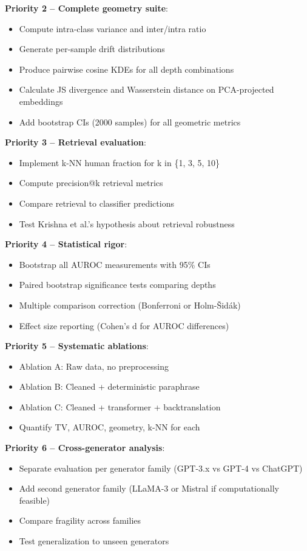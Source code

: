 \documentclass[conference]{IEEEtran}
\begin{document}
\textbf{Priority 2 – Complete geometry suite}:
\begin{itemize}
    \item Compute intra-class variance and inter/intra ratio
    \item Generate per-sample drift distributions
    \item Produce pairwise cosine KDEs for all depth combinations
    \item Calculate JS divergence and Wasserstein distance on PCA-projected embeddings
    \item Add bootstrap CIs (2000 samples) for all geometric metrics
\end{itemize}

\textbf{Priority 3 – Retrieval evaluation}:
\begin{itemize}
    \item Implement k-NN human fraction for k in \{1, 3, 5, 10\}
    \item Compute precision@k retrieval metrics
    \item Compare retrieval to classifier predictions
    \item Test Krishna et al.'s hypothesis about retrieval robustness
\end{itemize}

\textbf{Priority 4 – Statistical rigor}:
\begin{itemize}
    \item Bootstrap all AUROC measurements with 95\% CIs
    \item Paired bootstrap significance tests comparing depths
    \item Multiple comparison correction (Bonferroni or Holm-Šidák)
    \item Effect size reporting (Cohen's d for AUROC differences)
\end{itemize}

\textbf{Priority 5 – Systematic ablations}:
\begin{itemize}
    \item Ablation A: Raw data, no preprocessing
    \item Ablation B: Cleaned + deterministic paraphrase
    \item Ablation C: Cleaned + transformer + backtranslation
    \item Quantify TV, AUROC, geometry, k-NN for each
\end{itemize}

\textbf{Priority 6 – Cross-generator analysis}:
\begin{itemize}
    \item Separate evaluation per generator family (GPT-3.x vs GPT-4 vs ChatGPT)
    \item Add second generator family (LLaMA-3 or Mistral if computationally feasible)
    \item Compare fragility across families
    \item Test generalization to unseen generators
\end{itemize}
\end{document}
